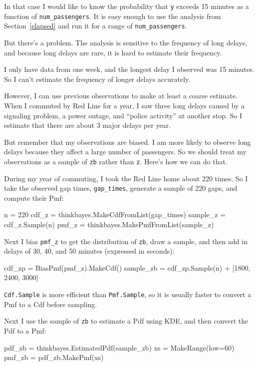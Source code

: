 \documentclass[12pt]{book}
\theoremstyle{exercise}
\newcommand{\py}[1]{{\tt #1}}%
\begin{document}
In that case I would like to know the probability that \py{y} exceeds
15 minutes as a function of \verb"num_passengers".  It is easy enough
to use the
analysis from Section~\ref{elapsed} and run it for a range of
\verb"num_passengers".

But there's a problem.
The analysis is sensitive to the frequency of long delays, and
because long delays are rare, it is hard to estimate
their frequency.

I only have data from one week,
and the longest delay I observed was 15 minutes.  So I can't
estimate the frequency of longer delays accurately.

However, I can use previous observations to make at least a coarse
estimate.  When I commuted by Red Line for a year, I saw three long
delays caused by a signaling problem, a power outage, and ``police
activity'' at another stop.  So I estimate that there are about
3 major delays per year.

But remember that my observations are biased.  I am more likely
to observe long delays because they affect a large number
of passengers.  So we should treat my observations as a sample
of \py{zb} rather than \py{z}.  Here's how we can do that.

During my year of commuting, I took the Red Line home about 220
times.  So I take the observed gap times, \verb"gap_times",
generate a sample of 220 gaps, and compute their Pmf:

\begin{code}
    n = 220
    cdf_z = thinkbayes.MakeCdfFromList(gap_times)
    sample_z = cdf_z.Sample(n)
    pmf_z = thinkbayes.MakePmfFromList(sample_z)
\end{code}

Next I bias \verb"pmf_z" to get the distribution of
\py{zb}, draw a sample, and then add in delays of
30, 40, and 50 minutes (expressed in seconds):

\begin{code}
    cdf_zp = BiasPmf(pmf_z).MakeCdf()
    sample_zb = cdf_zp.Sample(n) + [1800, 2400, 3000]
\end{code}

\py{Cdf.Sample} is more efficient than \py{Pmf.Sample}, so it
is usually faster to convert a Pmf to a Cdf before sampling.

Next I use the sample of \py{zb} to estimate a Pdf using
KDE, and then convert the Pdf to a Pmf:

\begin{code}
    pdf_zb = thinkbayes.EstimatedPdf(sample_zb)
    xs = MakeRange(low=60)
    pmf_zb = pdf_zb.MakePmf(xs)
\end{code}
\end{document}
